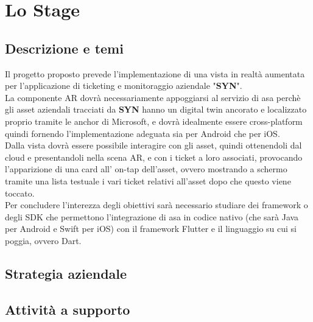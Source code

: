 
\chapter{Lo Stage}
\label{cap:lo-stage}
\section{Descrizione e temi}
Il progetto proposto prevede l'implementazione di una vista in realtà aumentata per l'applicazione di ticketing e monitoraggio aziendale "\textbf{SYN}".\\
La componente AR dovrà necessariamente appoggiarsi al servizio di {asa} perchè gli {asset} aziendali tracciati da \textbf{SYN} hanno un {digital twin} ancorato e localizzato proprio tramite le {anchor} di Microsoft, e dovrà idealmente essere cross-platform quindi fornendo l'implementazione adeguata sia per Android che per iOS.\\
Dalla vista dovrà essere possibile interagire con gli {asset}, quindi ottenendoli dal cloud e presentandoli nella scena AR, e con i ticket a loro associati, provocando l'apparizione di una card all' on-tap dell'{asset}, ovvero mostrando a schermo tramite una lista testuale i vari ticket relativi all'{asset} dopo che questo viene toccato.\\
Per concludere l'interezza degli obiettivi sarà necessario studiare dei {framework} o degli {SDK} che permettono l'integrazione di {asa} in codice nativo (che sarà Java per Android e Swift per iOS) con il {framework} Flutter e il linguaggio su cui si poggia, ovvero Dart.

\section{Strategia aziendale}
\section{Attività a supporto}


